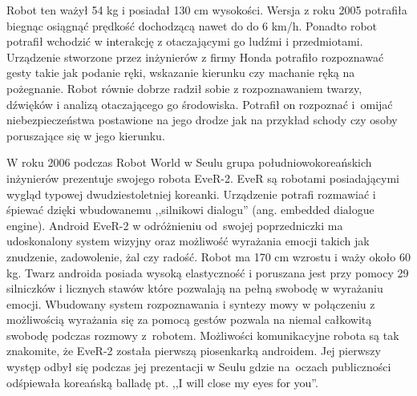 Robot ten ważył 54 kg i posiadał 130 cm wysokości. Wersja z roku 2005 potrafiła
biegnąc osiągnąć prędkość dochodzącą nawet do do 6 km/h. Ponadto robot potrafił
wchodzić w interakcję z otaczającymi go ludźmi i przedmiotami. Urządzenie
stworzone przez inżynierów z firmy Honda potrafiło rozpoznawać gesty takie jak
podanie ręki, wskazanie kierunku czy machanie ręką na pożegnanie. Robot równie
dobrze radził sobie z rozpoznawaniem twarzy, dźwięków i analizą otaczającego go
środowiska. Potrafił on rozpoznać i~omijać niebezpieczeństwa postawione na jego
drodze jak na przykład schody czy osoby poruszające się w jego kierunku.

W roku 2006 podczas Robot World w Seulu grupa południowokoreańskich inżynierów
prezentuje swojego robota EveR-2. EveR są robotami posiadającymi wygląd typowej
dwudziestoletniej koreanki. Urządzenie potrafi rozmawiać i śpiewać dzięki
wbudowanemu ,,silnikowi dialogu'' (ang. embedded dialogue engine). Android EveR-2
w odróżnieniu od~swojej poprzedniczki ma udoskonalony system wizyjny oraz
możliwość wyrażania emocji takich jak znudzenie, zadowolenie, żal czy radość.
Robot ma 170 cm wzrostu i waży około 60 kg. Twarz androida posiada wysoką
elastyczność i poruszana jest przy pomocy 29 silniczków i licznych stawów które
pozwalają na pełną swobodę w wyrażaniu emocji. Wbudowany system rozpoznawania i
syntezy mowy w połączeniu z możliwością wyrażania się za pomocą gestów pozwala na
niemal całkowitą swobodę podczas rozmowy z~robotem. Możliwości komunikacyjne
robota są tak znakomite, że EveR-2 została pierwszą piosenkarką androidem. Jej
pierwszy występ odbył się podczas jej prezentacji w Seulu gdzie na~oczach
publiczności odśpiewała koreańską balladę pt. ,,I will close my eyes for you''.

